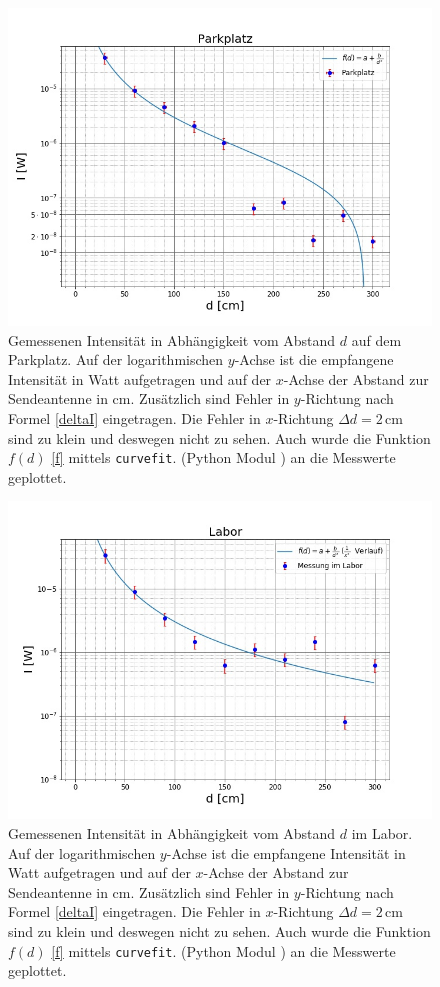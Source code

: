 \documentclass[titlepage,11pt,a4paper,ngerman]{article}
\begin{document}
\begin{figure}[ht]
	\includegraphics[scale=0.55]{Bilder/Abstand-Parkplatz.jpg}
	\centering
	\caption{Gemessenen Intensität in Abhängigkeit vom Abstand $d$ auf dem Parkplatz. Auf der logarithmischen $y$-Achse ist die empfangene Intensität in Watt aufgetragen und auf der $x$-Achse der Abstand zur Sendeantenne in cm. Zusätzlich sind Fehler in $y$-Richtung nach Formel \eqref{deltaI} eingetragen. Die Fehler in $x$-Richtung $\Delta d = 2\,$cm sind zu klein und deswegen nicht zu sehen. Auch wurde die Funktion $f(d)$ \eqref{f} mittels \texttt{curvefit}. (Python Modul \cite{curvescipy}) an die Messwerte geplottet.}
	\label{Parkplatz-A}
\end{figure}

\begin{figure}[ht]
	\includegraphics[scale=0.55]{Bilder/Abstand-Labor.jpg}
	\centering
	\caption{Gemessenen Intensität in Abhängigkeit vom Abstand $d$ im Labor. Auf der logarithmischen $y$-Achse ist die empfangene Intensität in Watt aufgetragen und auf der $x$-Achse der Abstand zur Sendeantenne in cm. Zusätzlich sind Fehler in $y$-Richtung nach Formel \eqref{deltaI} eingetragen. Die Fehler in $x$-Richtung $\Delta d = 2\,$cm sind zu klein und deswegen nicht zu sehen. Auch wurde die Funktion $f(d)$ \eqref{f} mittels \texttt{curvefit}. (Python Modul \cite{curvescipy}) an die Messwerte geplottet.}
	\label{Labor-A}
\end{figure}
\end{document}

